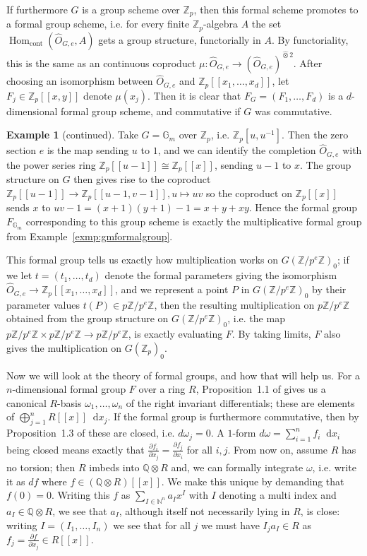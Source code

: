 \documentclass[12pt]{article}
\newcommand{\N}{\mathbb{N}}
\newcommand{\Z}{\mathbb{Z}}
\renewcommand{\G}{\mathbb{G}}
\newcommand{\Q}{\mathbb{Q}}
\newcommand*\diff{\mathop{}\!\mathrm{d}}
\newcommand{\tensor}{\otimes}
\DeclareMathOperator{\Hom}{Hom}
\theoremstyle{plain}
\theoremstyle{definition}
\newtheorem{exmp}[thm]{Example} %
\theoremstyle{remark}
\begin{document}
If furthermore $G$ is a group scheme over $\Z_p$, then this formal scheme promotes to a formal group scheme, i.e. for every finite $\Z_p$-algebra $A$ the set $\Hom_{\text{cont}}(\widehat{O}_{G,e},A)$ gets a group structure, functorially in $A$. By functoriality, this is the same as an continuous coproduct $\mu: \widehat{O}_{G,e} \to \left(\widehat{O}_{G,e}\right)^{\widehat{\tensor} 2}$. After choosing an isomorphism between $\widehat{O}_{G,e}$ and $\Z_p[[x_1,\dots,x_d]]$, let $F_j \in \Z_p[[x,y]]$ denote $\mu(x_j)$. Then it is clear that $F_G = (F_1,\dots,F_d)$ is a $d$-dimensional formal group scheme, and commutative if $G$ was commutative.
\addtocounter{thm}{-3}
\begin{exmp}[continued]
\label{exmp:gmtoformal}
Take $G = \G_m$ over $\Z_p$, i.e. $\Z_p[u,u^{-1}]$. Then the zero section $e$ is the map sending $u$ to $1$, and we can identify the completion $\widehat{O}_{G,e}$ with the power series ring $\Z_p[[u-1]] \cong \Z_p[[x]]$, sending $u-1$ to $x$. The group structure on $G$ then gives rise to the coproduct $\Z_p[[u-1]] \to \Z_p[[u-1,v-1]], u \mapsto uv$ so the coproduct on $\Z_p[[x]]$ sends $x$ to $uv-1 = (x+1)(y+1) -1 = x + y + xy$. Hence the formal group $F_{\G_m}$ corresponding to this group scheme is exactly the multiplicative formal group from Example~\ref{exmp:gmformalgroup}.
\end{exmp}

This formal group tells us exactly how multiplication works on $G(\Z/p^e\Z)_0$; if we let $t = (t_1,\dots,t_d)$ denote the formal parameters giving the isomorphism $\widehat{O}_{G,e} \to \Z_p[[x_1,\dots,x_d]]$, and we represent a point $P$ in $G(\Z/p^e\Z)_0$ by their parameter values $t(P) \in p\Z/p^e\Z$, then the resulting multiplication on $p\Z/p^e\Z$ obtained from the group structure on $G(\Z/p^e\Z)_0$, i.e. the map $p\Z/p^e\Z \times p\Z/p^e\Z \to p\Z/p^e\Z$, is exactly evaluating $F$. By taking limits, $F$ also gives the multiplication on $G(\Z_p)_0$.

Now we will look at the theory of formal groups, and how that will help us. For a $n$-dimensional formal group $F$ over a ring $R$, Proposition~1.1 of \citep{honda70} gives us a canonical $R$-basis $\omega_1,\dots,\omega_n$ of the right invariant differentials; these are elements of $\bigoplus_{j=1}^n R[[x]] \diff x_j$. If the formal group is furthermore commutative, then by Proposition~1.3 of \citep{honda70} these are closed, i.e. $d\omega_j = 0$. A $1$-form $d\omega = \sum_{i=1}^n f_i \diff x_i$ being closed means exactly that $\frac{\partial f_i}{\partial x_j} = \frac{\partial f_j}{\partial x_i}$ for all $i,j$. From now on, assume $R$ has no torsion; then $R$ imbeds into $\Q \tensor R$ and, we can formally integrate $\omega$, i.e. write it as $df$ where $f \in (\Q\tensor R)[[x]]$. We make this unique by demanding that $f(0) = 0$. Writing this $f$ as $\sum_{I \in \N^n} a_I x^I$ with $I$ denoting a multi index and $a_I \in \Q\tensor R$, we see that $a_I$, although itself not necessarily lying in $R$, is close: writing $I = (I_1,\dots,I_n)$ we see that for all $j$ we must have $I_j a_I \in R$ as $f_j = \frac{\partial f}{\partial x_j} \in R[[x]]$.
\end{document}
